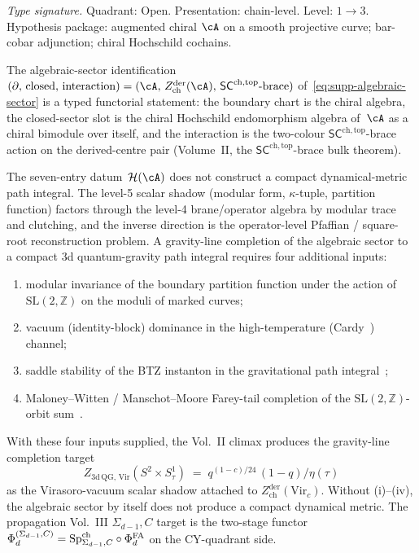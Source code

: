 \begin{remark}
\label{rem:thqg-intro-algebraic-sector-vs-dynamical-metric}
\textit{Type signature.}
Quadrant: Open. Presentation: chain-level. Level: $1 \to 3$.
Hypothesis package: augmented chiral $\cA$ on a smooth projective
curve; bar-cobar adjunction; chiral Hochschild cochains.
\medskip

The algebraic-sector identification
$(\partial,\,\mathrm{closed},\,\mathrm{interaction})
= (\cA,\,Z^{\mathrm{der}}_{\mathrm{ch}}(\cA),\,
\mathsf{SC}^{\mathrm{ch,top}}\text{-brace})$
of~\eqref{eq:supp-algebraic-sector} is a typed functorial statement:
the boundary chart is the chiral algebra, the closed-sector slot is the chiral
Hochschild endomorphism algebra of~$\cA$ as a chiral bimodule over
itself, and the interaction is the two-colour
$\mathsf{SC}^{\mathrm{ch,top}}$-brace action on the derived-centre
pair (Volume~II, the
$\mathsf{SC}^{\mathrm{ch,top}}$-brace bulk theorem).

The seven-entry datum~$\mathcal{H}(\cA)$ does not construct a compact
dynamical-metric path integral. The level-5 scalar shadow
(modular form, $\kappa$-tuple, partition function) factors through
the level-4 brane/operator algebra by modular trace and clutching,
and the inverse direction is the operator-level Pfaffian /
square-root reconstruction problem. A gravity-line completion of the
algebraic sector to a compact 3d quantum-gravity path integral
requires four additional inputs:
\begin{enumerate}[label=\textup{(\roman*)}]
\item modular invariance of the boundary partition function under
 the action of $\mathrm{SL}(2,\mathbb{Z})$ on the moduli of marked
 curves;
\item vacuum (identity-block) dominance in the high-temperature
 (Cardy~\cite{Cardy86}) channel;
\item saddle stability of the BTZ instanton in the gravitational path
 integral~\cite{BTZ92};
\item Maloney--Witten / Manschot--Moore Farey-tail completion of
 the $\mathrm{SL}(2,\mathbb{Z})$-orbit sum~\cite{Maloney-Witten07}.
\end{enumerate}
With these four inputs supplied, the Vol.~II climax produces the
gravity-line completion target
\[
Z_{\mathrm{3d\,QG,\,Vir}}(S^2 \times S^1_\tau)
\;=\;
q^{(1-c)/24}\,(1-q)/\eta(\tau)
\]
as the Virasoro-vacuum scalar shadow attached to
$Z^{\mathrm{der}}_{\mathrm{ch}}(\mathrm{Vir}_c)$. Without
\textup{(i)--(iv)}, the algebraic sector by itself does not produce a
compact dynamical metric. The propagation Vol.~III $\Sigma_{d-1}, C$
target is the two-stage functor
$\Phi_d^{(\Sigma_{d-1}, C)} = \mathrm{Sp}^{\mathrm{ch}}_{\Sigma_{d-1},
C} \circ \Phi^{\mathrm{FA}}_d$ on the CY-quadrant side.
\end{remark}

